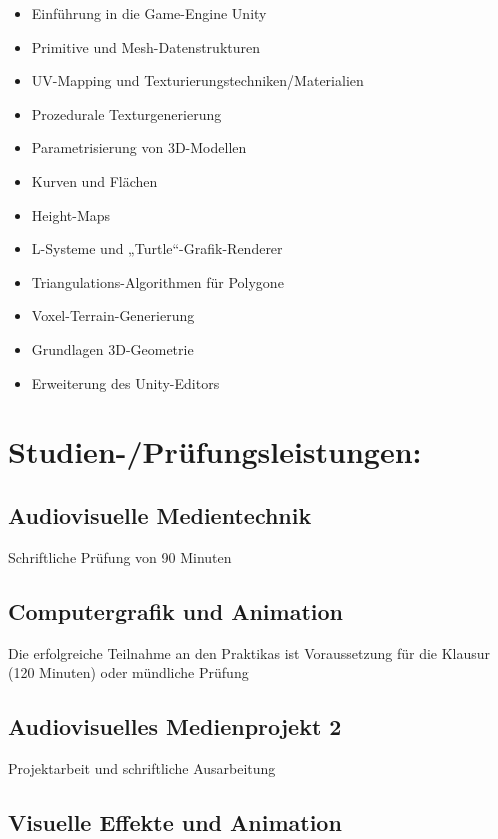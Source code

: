 \begin{itemize}
\tightlist
\item
  Einführung in die Game-Engine Unity
\item
  Primitive und Mesh-Datenstrukturen
\item
  UV-Mapping und Texturierungstechniken/Materialien
\item
  Prozedurale Texturgenerierung
\item
  Parametrisierung von 3D-Modellen
\item
  Kurven und Flächen
\item
  Height-Maps
\item
  L-Systeme und „Turtle``-Grafik-Renderer
\item
  Triangulations-Algorithmen für Polygone
\item
  Voxel-Terrain-Generierung
\item
  Grundlagen 3D-Geometrie
\item
  Erweiterung des Unity-Editors
\end{itemize}

\section*{Studien-/Prüfungsleistungen:}\label{studien-pruxfcfungsleistungen-23}

\subsection*{Audiovisuelle
Medientechnik}\label{audiovisuelle-medientechnik-2}

Schriftliche Prüfung von 90 Minuten

\subsection*{Computergrafik und
Animation}\label{computergrafik-und-animation-2}

Die erfolgreiche Teilnahme an den Praktikas ist Voraussetzung für die
Klausur (120 Minuten) oder mündliche Prüfung

\subsection*{Audiovisuelles Medienprojekt
2}\label{audiovisuelles-medienprojekt-2-2}

Projektarbeit und schriftliche Ausarbeitung

\subsection*{Visuelle Effekte und
Animation}\label{visuelle-effekte-und-animation-2}

